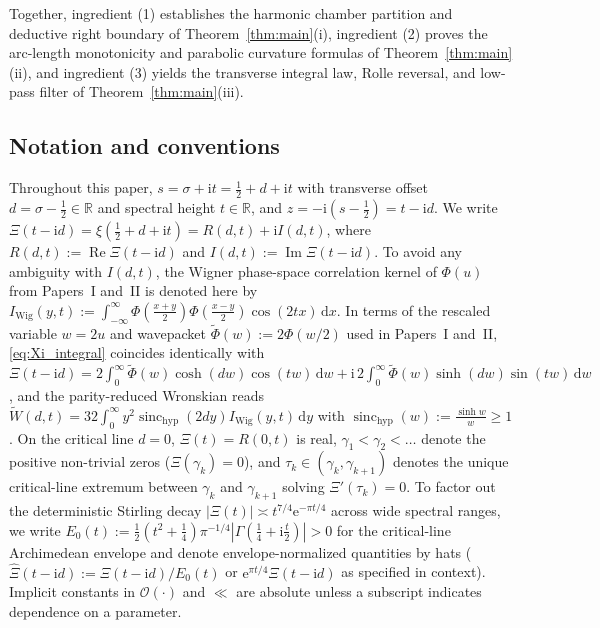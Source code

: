 \documentclass[11pt,a4paper,reqno]{amsart}
\theoremstyle{definition}
\theoremstyle{remark}
\numberwithin{equation}{section}
\newcommand{\dd}{\mathrm{d}}
\newcommand{\ii}{\mathrm{i}}
\newcommand{\ee}{\mathrm{e}}
\newcommand{\Rea}{\operatorname{Re}}
\newcommand{\Ima}{\operatorname{Im}}
\newcommand{\Wtil}{\widetilde{W}}
\newcommand{\sinch}{\operatorname{sinc}_{\mathrm{hyp}}}
\begin{document}
Together, ingredient (1) establishes the harmonic chamber partition and deductive right boundary of Theorem~\ref{thm:main}(i), ingredient (2) proves the arc-length monotonicity and parabolic curvature formulas of Theorem~\ref{thm:main}(ii), and ingredient (3) yields the transverse integral law, Rolle reversal, and low-pass filter of Theorem~\ref{thm:main}(iii).

\subsection{Notation and conventions}\label{subsec:notation}

Throughout this paper, $s = \sigma + \ii t = \frac{1}{2} + d + \ii t$ with transverse offset $d = \sigma - \frac{1}{2} \in \mathbb{R}$ and spectral height $t \in \mathbb{R}$, and $z = -\ii(s-\frac{1}{2}) = t - \ii d$. We write $\Xi(t-\ii d) = \xi(\frac{1}{2}+d+\ii t) = R(d,t) + \ii I(d,t)$, where $R(d,t) := \Rea\Xi(t-\ii d)$ and $I(d,t) := \Ima\Xi(t-\ii d)$. To avoid any ambiguity with $I(d,t)$, the Wigner phase-space correlation kernel of $\Phi(u)$ from Papers~I and~II \cite{Missiaen2026Paper1,Missiaen2026Paper2} is denoted here by $I_{\mathrm{Wig}}(y,t) := \int_{-\infty}^\infty \Phi(\frac{x+y}{2})\Phi(\frac{x-y}{2})\cos(2t x)\,\dd x$. In terms of the rescaled variable $w = 2u$ and wavepacket $\widetilde{\Phi}(w) := 2\Phi(w/2)$ used in Papers~I and~II, \eqref{eq:Xi_integral} coincides identically with $\Xi(t-\ii d) = 2\int_0^\infty \widetilde{\Phi}(w)\cosh(d w)\cos(t w)\,\dd w + \ii\,2\int_0^\infty \widetilde{\Phi}(w)\sinh(d w)\sin(t w)\,\dd w$, and the parity-reduced Wronskian reads $\Wtil(d,t) = 32\int_0^\infty y^2\sinch(2d y)I_{\mathrm{Wig}}(y,t)\,\dd y$ with $\sinch(w) := \frac{\sinh w}{w} \ge 1$. On the critical line $d = 0$, $\Xi(t) = R(0,t)$ is real, $\gamma_1 < \gamma_2 < \dots$ denote the positive non-trivial zeros ($\Xi(\gamma_k) = 0$), and $\tau_k \in (\gamma_k, \gamma_{k+1})$ denotes the unique critical-line extremum between $\gamma_k$ and $\gamma_{k+1}$ solving $\Xi'(\tau_k) = 0$. To factor out the deterministic Stirling decay $|\Xi(t)| \asymp t^{7/4}\ee^{-\pi t/4}$ across wide spectral ranges, we write $E_0(t) := \frac{1}{2}(t^2+\frac{1}{4})\pi^{-1/4}|\Gamma(\frac{1}{4}+\ii\frac{t}{2})| > 0$ for the critical-line Archimedean envelope and denote envelope-normalized quantities by hats ($\widehat{\Xi}(t-\ii d) := \Xi(t-\ii d)/E_0(t)$ or $\ee^{\pi t/4}\Xi(t-\ii d)$ as specified in context). Implicit constants in $\mathcal{O}(\cdot)$ and $\ll$ are absolute unless a subscript indicates dependence on a parameter.
\end{document}
